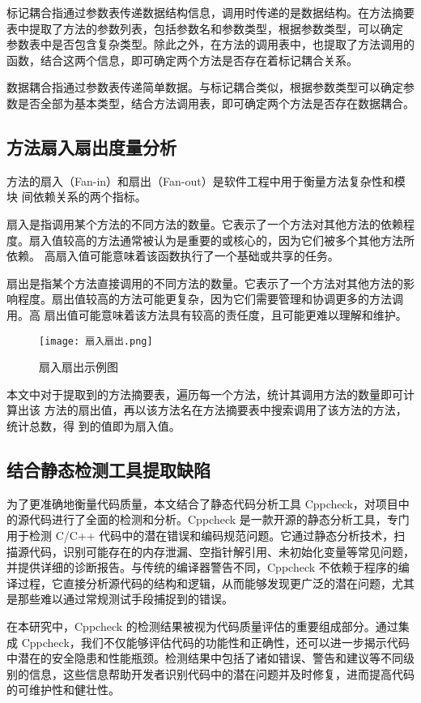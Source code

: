 标记耦合指通过参数表传递数据结构信息，调用时传递的是数据结构。在方法摘要
表中提取了方法的参数列表，包括参数名和参数类型，根据参数类型，可以确定
参数表中是否包含复杂类型。除此之外，在方法的调用表中，也提取了方法调用的
函数，结合这两个信息，即可确定两个方法是否存在着标记耦合关系。


数据耦合指通过参数表传递简单数据。与标记耦合类似，根据参数类型可以确定参
数是否全部为基本类型，结合方法调用表，即可确定两个方法是否存在数据耦合。
\subsection{方法扇入扇出度量分析}

方法的扇入（Fan-in）和扇出（Fan-out）是软件工程中用于衡量方法复杂性和模块
间依赖关系的两个指标。


扇入是指调用某个方法的不同方法的数量。它表示了一个方法对其他方法的依赖程
度。扇入值较高的方法通常被认为是重要的或核心的，因为它们被多个其他方法所依赖。
高扇入值可能意味着该函数执行了一个基础或共享的任务。


扇出是指某个方法直接调用的不同方法的数量。它表示了一个方法对其他方法的影
响程度。扇出值较高的方法可能更复杂，因为它们需要管理和协调更多的方法调用。高
扇出值可能意味着该方法具有较高的责任度，且可能更难以理解和维护。

\begin{figure}[h]
\centering
\texttt{[image: 扇入扇出.png]}
\caption{扇入扇出示例图}
\end{figure}

本文中对于提取到的方法摘要表，遍历每一个方法，统计其调用方法的数量即可计算出该
方法的扇出值，再以该方法名在方法摘要表中搜索调用了该方法的方法，统计总数，得
到的值即为扇入值。

\subsection{结合静态检测工具提取缺陷}

为了更准确地衡量代码质量，本文结合了静态代码分析工具 Cppcheck，对项目中的源代码进行了全面的检测和分析。Cppcheck 是一款开源的静态分析工具，专门用于检测 C/C++ 代码中的潜在错误和编码规范问题。它通过静态分析技术，扫描源代码，识别可能存在的内存泄漏、空指针解引用、未初始化变量等常见问题，并提供详细的诊断报告。与传统的编译器警告不同，Cppcheck 不依赖于程序的编译过程，它直接分析源代码的结构和逻辑，从而能够发现更广泛的潜在问题，尤其是那些难以通过常规测试手段捕捉到的错误。

在本研究中，Cppcheck 的检测结果被视为代码质量评估的重要组成部分。通过集成 Cppcheck，我们不仅能够评估代码的功能性和正确性，还可以进一步揭示代码中潜在的安全隐患和性能瓶颈。检测结果中包括了诸如错误、警告和建议等不同级别的信息，这些信息帮助开发者识别代码中的潜在问题并及时修复，进而提高代码的可维护性和健壮性。

